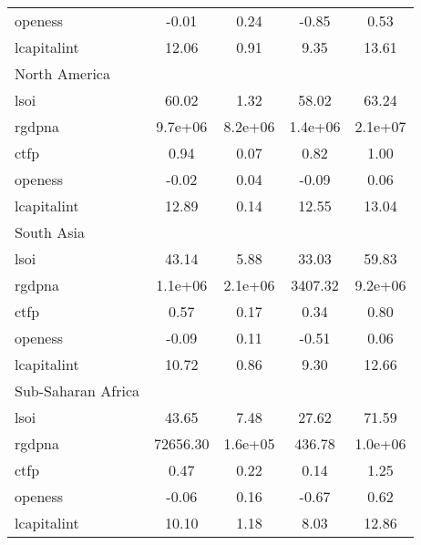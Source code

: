 {\begin{tabular}{l*{1}{cccc}}
openess     &       -0.01&        0.24&       -0.85&        0.53\\
lcapitalint &       12.06&        0.91&        9.35&       13.61\\
\hline
North America&            &            &            &            \\
lsoi        &       60.02&        1.32&       58.02&       63.24\\
rgdpna      &     9.7e+06&     8.2e+06&     1.4e+06&     2.1e+07\\
ctfp        &        0.94&        0.07&        0.82&        1.00\\
openess     &       -0.02&        0.04&       -0.09&        0.06\\
lcapitalint &       12.89&        0.14&       12.55&       13.04\\
\hline
South Asia  &            &            &            &            \\
lsoi        &       43.14&        5.88&       33.03&       59.83\\
rgdpna      &     1.1e+06&     2.1e+06&     3407.32&     9.2e+06\\
ctfp        &        0.57&        0.17&        0.34&        0.80\\
openess     &       -0.09&        0.11&       -0.51&        0.06\\
lcapitalint &       10.72&        0.86&        9.30&       12.66\\
\hline
Sub-Saharan Africa&            &            &            &            \\
lsoi        &       43.65&        7.48&       27.62&       71.59\\
rgdpna      &    72656.30&     1.6e+05&      436.78&     1.0e+06\\
ctfp        &        0.47&        0.22&        0.14&        1.25\\
openess     &       -0.06&        0.16&       -0.67&        0.62\\
lcapitalint &       10.10&        1.18&        8.03&       12.86\\
\hline\hline
\end{tabular}
}
